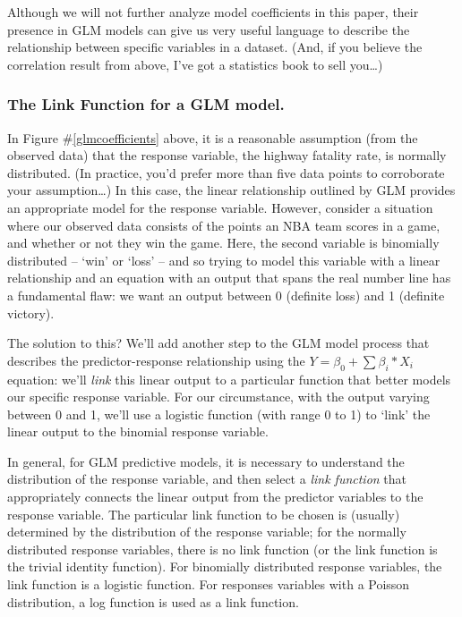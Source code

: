 \documentclass[12pt]{article}
\begin{document}
Although we will not further analyze model coefficients in this paper, their presence in GLM models can give us very useful language to describe the relationship between specific variables in a dataset.  (And, if you believe the correlation result from above, I've got a statistics book to sell you\dots)

	\subsubsection{The Link Function for a GLM model.}

In Figure \#\ref{glmcoefficients} above, it is a reasonable assumption (from the observed data) that the response variable, the highway fatality rate, is normally 
distributed.  (In practice, you'd prefer more than five data points to corroborate your assumption\dots)  In this case, the linear relationship
outlined by GLM provides an appropriate model for the response variable.  However, consider a situation where our observed data consists of the 
points an NBA team scores in a game, and whether or not they win the game.  Here, the second variable is binomially distributed -- `win' or `loss' 
-- and so trying to model this variable with a linear relationship and an equation with an output that spans the real number line has a fundamental
flaw:  we want an output between 0 (definite loss) and 1 (definite victory).


The solution to this?  We'll add another step to the GLM model process that describes the predictor-response relationship using the 
$Y=\beta_0 + \sum \beta_i*X_i$ equation:  we'll \textit{link} this linear output to a particular function that better models our specific response
variable.  For our circumstance, with the output varying between 0 and 1, we'll use a logistic function (with range 0 to 1) to `link' the linear 
output to the binomial response variable.  


In general, for GLM predictive models, it is necessary to understand the distribution of the response variable, and then select a
\textit{link function} that appropriately connects the linear output from the predictor variables to the response variable.  The particular
link function to be chosen is (usually) determined by the distribution of the response variable; for the normally distributed response variables,
there is no link function (or the link function is the trivial identity function).  For binomially distributed response variables, the link 
function is a logistic function.  For responses variables with a Poisson distribution, a log function is used as a link function.
\end{document}
